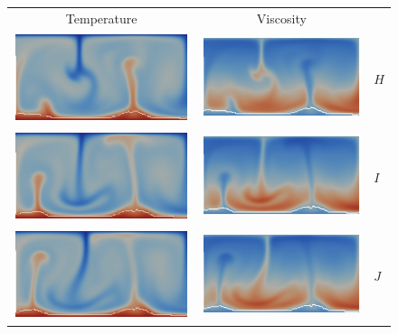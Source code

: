 \begin{figure}[htbp]
\begin{center}
\begin{tabular}{c c l}
Temperature & Viscosity \\
\includegraphics[width=0.45\columnwidth]{chapters/vynnytska/figures/tmH.png} &
\includegraphics[width=0.45\columnwidth]{chapters/vynnytska/figures/visH.png} & $H$ \\
\includegraphics[width=0.45\columnwidth]{chapters/vynnytska/figures/tmI.png} &
\includegraphics[width=0.45\columnwidth]{chapters/vynnytska/figures/visI.png} & $I$ \\
\includegraphics[width=0.45\columnwidth]{chapters/vynnytska/figures/tmJ.png} &
\includegraphics[width=0.45\columnwidth]{chapters/vynnytska/figures/visJ.png} & $J$ \\

\end{tabular}
\end{center}
\end{figure}
